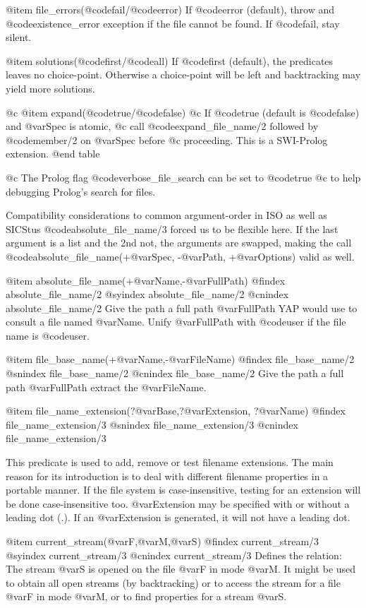 {{{{{    @item file_errors(@code{fail}/@code{error})
If @code{error} (default), throw and @code{existence_error} exception
if the file cannot be found.  If @code{fail}, stay silent.

    @item solutions(@code{first}/@code{all})
If @code{first} (default), the predicates leaves no choice-point.
Otherwise a choice-point will be left and backtracking may yield
more solutions.

@c     @item expand(@code{true}/@code{false})
@c If @code{true} (default is @code{false}) and @var{Spec} is atomic,
@c call @code{expand_file_name/2} followed by @code{member/2} on @var{Spec} before
@c proceeding.  This is a SWI-Prolog extension.
@end table

@c The Prolog flag @code{verbose_file_search} can be set to @code{true}
@c to help debugging Prolog's search for files.

Compatibility considerations to common argument-order in ISO as well
as SICStus @code{absolute_file_name/3} forced us to be flexible here.
If the last argument is a list and the 2nd not, the arguments are
swapped, making the call @code{absolute_file_name}(+@var{Spec}, -@var{Path},
+@var{Options}) valid as well.

@item absolute_file_name(+@var{Name},-@var{FullPath})
@findex absolute_file_name/2
@syindex absolute_file_name/2
@cnindex absolute_file_name/2
Give the path a full path @var{FullPath} YAP would use to consult a file
named @var{Name}.  Unify @var{FullPath} with @code{user} if the file
name is @code{user}.

@item file_base_name(+@var{Name},-@var{FileName})
@findex file_base_name/2
@snindex file_base_name/2
@cnindex file_base_name/2
Give the path a full path @var{FullPath} extract the @var{FileName}.

@item file_name_extension(?@var{Base},?@var{Extension}, ?@var{Name})
@findex file_name_extension/3
@snindex file_name_extension/3
@cnindex file_name_extension/3

This predicate is used to add, remove or test filename extensions. The
main reason for its introduction is to deal with different filename
properties in a portable manner. If the file system is
case-insensitive, testing for an extension will be done
case-insensitive too. @var{Extension} may be specified with or
without a leading dot (.). If an @var{Extension} is generated, it
will not have a leading dot.

@item current_stream(@var{F},@var{M},@var{S})
@findex current_stream/3
@syindex current_stream/3
@cnindex current_stream/3
Defines the relation: The stream @var{S} is opened on the file @var{F}
in mode @var{M}. It might be used to obtain all open streams (by
backtracking) or to access the stream for a file @var{F} in mode
@var{M}, or to find properties for a stream @var{S}.

}}}}}
